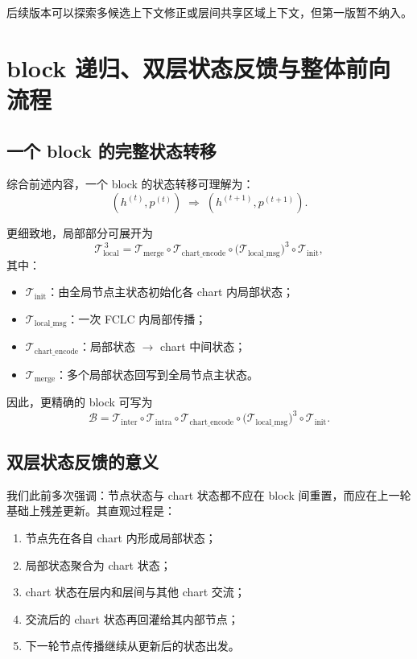 \documentclass[12pt,a4paper]{ctexart}
\begin{document}
后续版本可以探索多候选上下文修正或层间共享区域上下文，但第一版暂不纳入。

\section{block 递归、双层状态反馈与整体前向流程}

\subsection{一个 block 的完整状态转移}

综合前述内容，一个 block 的状态转移可理解为：
\[
(h^{(t)},p^{(t)})
\;\Longrightarrow\;
(h^{(t+1)},p^{(t+1)}).
\]

更细致地，局部部分可展开为
\[
\mathcal T_{\mathrm{local}}^{\,3}
=
\mathcal T_{\mathrm{merge}}
\circ
\mathcal T_{\mathrm{chart\_encode}}
\circ
\big(
\mathcal T_{\mathrm{local\_msg}}
\big)^3
\circ
\mathcal T_{\mathrm{init}},
\]
其中：
\begin{itemize}[leftmargin=2em]
    \item \(\mathcal T_{\mathrm{init}}\)：由全局节点主状态初始化各 chart 内局部状态；
    \item \(\mathcal T_{\mathrm{local\_msg}}\)：一次 FCLC 内局部传播；
    \item \(\mathcal T_{\mathrm{chart\_encode}}\)：局部状态 \(\to\) chart 中间状态；
    \item \(\mathcal T_{\mathrm{merge}}\)：多个局部状态回写到全局节点主状态。
\end{itemize}

因此，更精确的 block 可写为
\[
\mathcal B
=
\mathcal T_{\mathrm{inter}}
\circ
\mathcal T_{\mathrm{intra}}
\circ
\mathcal T_{\mathrm{chart\_encode}}
\circ
\big(\mathcal T_{\mathrm{local\_msg}}\big)^3
\circ
\mathcal T_{\mathrm{init}}.
\]

\subsection{双层状态反馈的意义}

我们此前多次强调：节点状态与 chart 状态都不应在 block 间重置，而应在上一轮基础上残差更新。其直观过程是：

\begin{enumerate}[leftmargin=2em]
    \item 节点先在各自 chart 内形成局部状态；
    \item 局部状态聚合为 chart 状态；
    \item chart 状态在层内和层间与其他 chart 交流；
    \item 交流后的 chart 状态再回灌给其内部节点；
    \item 下一轮节点传播继续从更新后的状态出发。
\end{enumerate}
\end{document}
